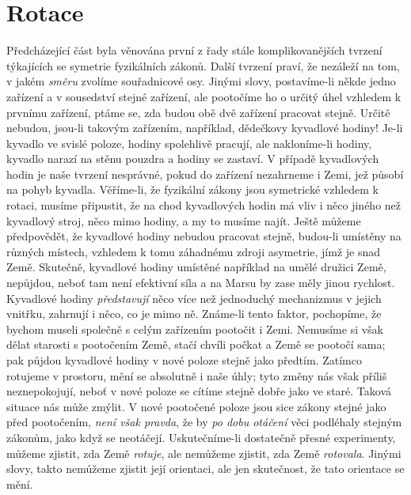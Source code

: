   \section{Rotace}\label{fyz:IchapXIsecII}
    Předcházející část byla věnována první z řady stále komplikovanějších tvrzení týkajících se 
    symetrie fyzikálních zákonů. Další tvrzení praví, že nezáleží na tom, v jakém \emph{směru} 
    zvolíme souřadnicové osy. Jinými slovy, postavíme-li někde jedno zařízení a v sousedství 
    stejné zařízení, ale pootočíme ho o určitý úhel vzhledem k prvnímu zařízení, ptáme se, zda 
    budou obě dvě zařízení pracovat stejně. Určitě nebudou, jsou-li takovým zařízením, například, 
    dědečkovy kyvadlové hodiny! Je-li kyvadlo ve svislé poloze, hodiny spolehlivě pracují, ale 
    nakloníme-li hodiny, kyvadlo narazí na stěnu pouzdra a hodiny se zastaví. V případě kyvadlových 
    hodin je naše tvrzení nesprávné, pokud do zařízení nezahrneme i Zemi, jež působí na pohyb 
    kyvadla. Věříme-li, že fyzikální zákony jsou symetrické vzhledem k rotaci, musíme připustit, že 
    na chod kyvadlových hodin má vliv i něco jiného než kyvadlový stroj, něco mimo hodiny, a my to 
    musíme najít. Ještě můžeme předpovědět, že kyvadlové hodiny nebudou pracovat stejně, budou-li 
    umístěny na různých místech, vzhledem k tomu záhadnému zdroji asymetrie, jímž je snad Země. 
    Skutečně, kyvadlové hodiny umístěné například na umělé družici Země, nepůjdou, neboť tam není 
    efektivní síla a na Marsu by zase měly jinou rychlost. Kyvadlové hodiny \emph{představují} něco 
    více než jednoduchý mechanizmus v jejich vnitřku, zahrnují i něco, co je mimo ně. Známe-li 
    tento faktor, pochopíme, že bychom museli společně s celým zařízením pootočit i Zemi. Nemusíme 
    si však dělat starosti s pootočením Země, stačí chvíli počkat a Země se pootočí sama; pak 
    půjdou kyvadlové hodiny v nové poloze stejně jako předtím. Zatímco rotujeme v prostoru, mění se 
    absolutně i naše úhly; tyto změny nás však příliš neznepokojují, neboť v nové poloze se cítíme 
    stejně dobře jako ve staré. Taková situace nás může zmýlit. V nové pootočené poloze jsou sice 
    zákony stejné jako před pootočením, \emph{není však pravda}, že by \emph{po dobu otáčení} věci 
    podléhaly stejným zákonům, jako když se neotáčejí. Uskutečníme-li dostatečně přesné 
    experimenty, můžeme zjistit, zda Země \emph{rotuje}, ale nemůžeme zjistit, zda Země 
    \emph{rotovala}. Jinými slovy, takto nemůžeme zjistit její orientaci, ale jen skutečnost, že 
    tato orientace se mění.

